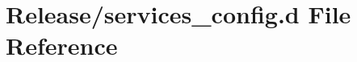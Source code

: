 \hypertarget{services__config_8d}{}\section{Release/services\+\_\+config.d File Reference}
\label{services__config_8d}
